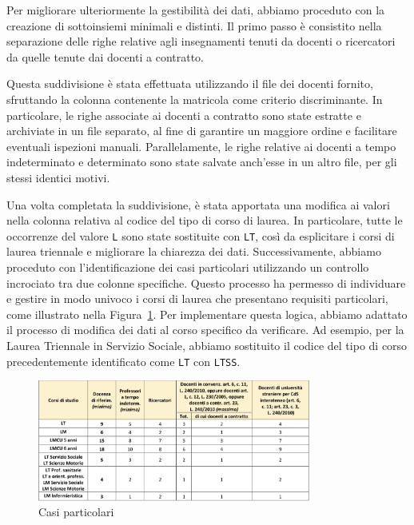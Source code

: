 Per migliorare ulteriormente la gestibilità dei dati, abbiamo proceduto con la creazione 
di sottoinsiemi minimali e distinti. Il primo passo è consistito nella separazione delle 
righe relative agli insegnamenti tenuti da docenti o ricercatori da quelle tenute dai 
docenti a contratto.

Questa suddivisione è stata effettuata utilizzando il file dei docenti fornito, 
sfruttando la colonna contenente la matricola come criterio discriminante. In particolare, 
le righe associate ai docenti a contratto sono state estratte e archiviate in un file separato, 
al fine di garantire un maggiore ordine e facilitare eventuali ispezioni manuali. 
Parallelamente, le righe relative ai docenti a tempo indeterminato e determinato sono 
state salvate anch'esse in un altro file, per gli stessi identici motivi.

Una volta completata la suddivisione, è stata apportata una modifica ai valori nella colonna 
relativa al codice del tipo di corso di laurea. In particolare, tutte le occorrenze del 
valore \texttt{L} sono state sostituite con \texttt{LT}, così da esplicitare i corsi di 
laurea triennale e migliorare la chiarezza dei dati. Successivamente, abbiamo proceduto con 
l'identificazione dei casi particolari utilizzando un controllo incrociato tra due colonne 
specifiche. Questo processo ha permesso di individuare e gestire in modo univoco i corsi 
di laurea che presentano requisiti particolari, come illustrato nella 
Figura~\ref{fig:casi_particolari}.
Per implementare questa logica, abbiamo adattato il processo di modifica dei dati al corso 
specifico da verificare. Ad esempio, per la Laurea Triennale in Servizio Sociale, abbiamo 
sostituito il codice del tipo di corso precedentemente identificato come \texttt{LT} con 
\texttt{LTSS}.

\begin{figure}[h]
    \centering
    \includegraphics[width=0.8\textwidth]{./images/tabellaministeriale.png}
    \caption{Casi particolari}
    \label{fig:casi_particolari}
\end{figure}


